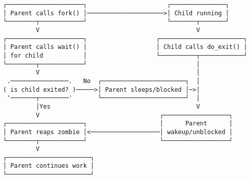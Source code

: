 \documentclass[varwidth=45em,crop]{standalone}
\begin{document}
\begin{verbatim}
┌─────────────────────┐                      ┌───────────────┐
│ Parent calls fork() │─────────────────────>│ Child running │
└────────┬────────────┘                      └───────┬───────┘
         V                                           V
┌─────────────────────┐                   ┌───────────────────────┐
│ Parent calls wait() │                   │ Child calls do_exit() │
│ for child           │                   └──────────┬────────────┘
└────────┬────────────┘                              │
         V                                           │
 .────────────────.   No  ┌───────────────────────┐  │
( is child exited? )─────>│ Parent sleeps/blocked │─>│
 '───────┬────────'       └───────────────────────┘  │
         │Yes                                        V
         V                                 ┌──────────────────┐
┌─────────────────────┐                    │      Parent      │
│ Parent reaps zombie │<───────────────────│ wakeup/unblocked │
└────────┬────────────┘                    └──────────────────┘
         V
┌───────────────────────┐
│ Parent continues work │
└───────────────────────┘
\end{verbatim}
\end{document}
